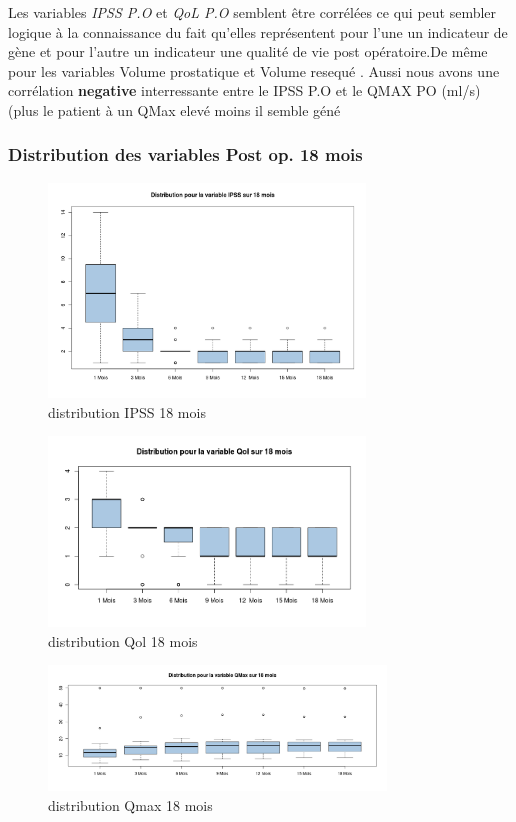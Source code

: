 Les variables  \emph{IPSS P.O} et   \emph{QoL P.O}  semblent être corrélées ce qui peut sembler logique à la connaissance du fait 
qu’elles représentent pour l’une un indicateur de gène et pour l’autre un indicateur une qualité de vie post opératoire.De même  pour les variables Volume prostatique et Volume resequé . Aussi nous avons une corrélation \textbf{negative} interressante entre le IPSS P.O et le QMAX PO (ml/s) (plus le patient à un QMax elevé moins il semble géné


\subsubsection{Distribution des variables Post op. 18 mois}

\begin{figure}[!h]
\centering
\includegraphics[width=0.75\textwidth]{../Fig/RTUPB//rtupb-boxplot-post-ipss}
\caption{distribution IPSS 18 mois}
\end{figure}


\begin{figure}[!h]
\centering
\includegraphics[width=0.75\textwidth]{../Fig/RTUPB//rtupb-boxplot-post-Qol}
\caption{distribution Qol 18 mois}
\end{figure}

\begin{figure}[!h]
\centering
\includegraphics[width=0.80\textwidth]{../Fig/RTUPB//rtupb-boxplot-post-Qmax}
\caption{distribution Qmax 18 mois}
\end{figure}






